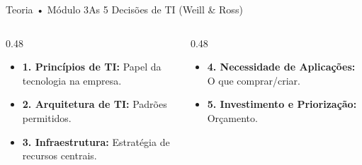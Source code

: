 \begin{senaiframe}{Teoria • Módulo 3}{As 5 Decisões de TI (Weill \& Ross)}
  \begin{columns}[t]
    \begin{column}{0.48\textwidth}
      \begin{tcolorbox}[senaibluecard, title={Diretrizes \& Infraestrutura}]
        \begin{itemize}
          \item \textbf{1. Princípios de TI:} Papel da tecnologia na empresa.
          \item \textbf{2. Arquitetura de TI:} Padrões permitidos.
          \item \textbf{3. Infraestrutura:} Estratégia de recursos centrais.
        \end{itemize}
      \end{tcolorbox}
    \end{column}
    \begin{column}{0.48\textwidth}
      \begin{tcolorbox}[senaicard, title={Aplicações \& Investimento}]
        \begin{itemize}
          \item \textbf{4. Necessidade de Aplicações:} O que comprar/criar.
          \item \textbf{5. Investimento e Priorização:} Orçamento.
        \end{itemize}
      \end{tcolorbox}
    \end{column}
  \end{columns}
\end{senaiframe}

